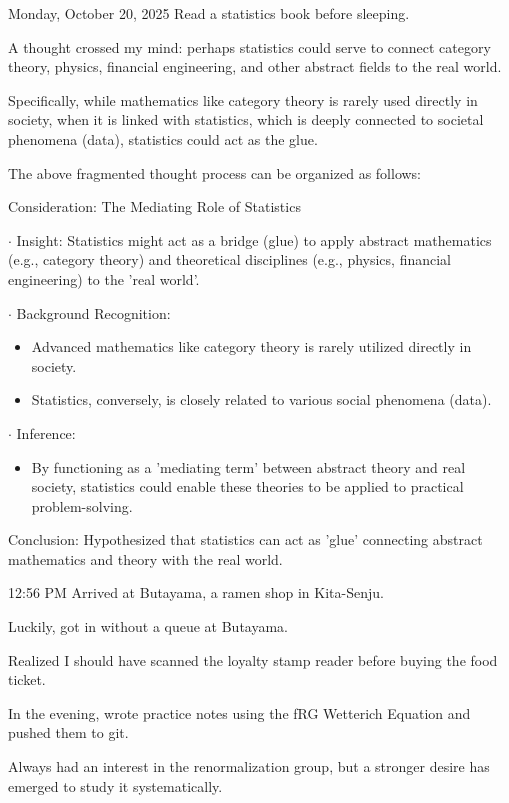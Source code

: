 \documentclass[dvipdfmx, autodetect-engine, aspectratio=169, 10.5pt]{beamer}
\begin{document}
\begin{frame}{Monday, October 20, 2025}
	\scriptsize
	Read a statistics book before sleeping.

	A thought crossed my mind: perhaps statistics could serve to connect category theory, physics, financial engineering, and other abstract fields to the real world.

	Specifically, while mathematics like category theory is rarely used directly in society, when it is linked with statistics, which is deeply connected to societal phenomena (data), statistics could act as the glue.

	The above fragmented thought process can be organized as follows:

	Consideration: The Mediating Role of Statistics

	$\cdot$ Insight: Statistics might act as a bridge (glue) to apply abstract mathematics (e.g., category theory) and theoretical disciplines (e.g., physics, financial engineering) to the 'real world'.

	$\cdot$ Background Recognition:

	\begin{itemize}
		\item Advanced mathematics like category theory is rarely utilized directly in society.
		\item Statistics, conversely, is closely related to various social phenomena (data).
	\end{itemize}

	$\cdot$ Inference:

	\begin{itemize}
		\item By functioning as a 'mediating term' between abstract theory and real society, statistics could enable these theories to be applied to practical problem-solving.
	\end{itemize}

	Conclusion:
	Hypothesized that statistics can act as 'glue' connecting abstract mathematics and theory with the real world.

	12:56 PM
	Arrived at Butayama, a ramen shop in Kita-Senju.

	Luckily, got in without a queue at Butayama.

	Realized I should have scanned the loyalty stamp reader before buying the food ticket.

	In the evening, wrote practice notes using the fRG Wetterich Equation and pushed them to git.

	Always had an interest in the renormalization group, but a stronger desire has emerged to study it systematically.
\end{frame}
\end{document}
